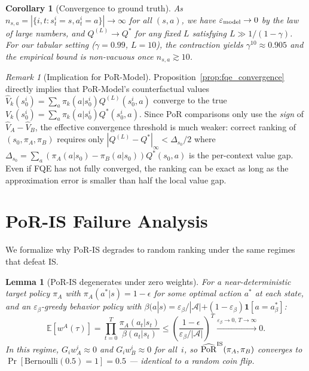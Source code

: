 \documentclass[10pt]{article}
\theoremstyle{plain}
\newtheorem{lemma}[theorem]{Lemma}
\newtheorem{corollary}[theorem]{Corollary}
\theoremstyle{definition}
\theoremstyle{remark}
\newtheorem{remark}{Remark}
\newcommand{\E}{\mathbb{E}}
\newcommand{\PoR}{\mathrm{PoR}}
\newcommand{\calA}{\mathcal{A}}
\begin{document}
\begin{corollary}[Convergence to ground truth]
  \label{cor:fqe_gt}
  As $n_{s,a}=|\{i,t: s_t^i=s, a_t^i=a\}|\to\infty$ for all $(s,a)$,
  we have $\varepsilon_{\rm model}\to 0$ by the law of large numbers,
  and $Q^{(L)}\to Q^*$ for any fixed $L$ satisfying $L\gg 1/(1-\gamma)$.
  For our tabular setting ($\gamma=0.99$, $L=10$), the contraction yields
  $\gamma^{10}\approx 0.905$ and the empirical bound is non-vacuous once
  $n_{s,a}\gtrsim 10$.
\end{corollary}

\begin{remark}[Implication for PoR-Model]
  Proposition~\ref{prop:fqe_convergence} directly implies that
  PoR-Model's counterfactual values $\hat{V}_k(s_0^i)=\sum_a\pi_k(a|s_0^i)Q^{(L)}(s_0^i,a)$
  converge to the true $V_k(s_0^i)=\sum_a\pi_k(a|s_0^i)Q^*(s_0^i,a)$.
  Since PoR comparisons only use the \emph{sign} of $\hat{V}_A-\hat{V}_B$,
  the effective convergence threshold is much weaker: correct ranking of
  $(s_0,\pi_A,\pi_B)$ requires only $|Q^{(L)}-Q^*|_\infty < \Delta_{s_0}/2$
  where $\Delta_{s_0}=\sum_a(\pi_A(a|s_0)-\pi_B(a|s_0))Q^*(s_0,a)$ is the
  per-context value gap.  Even if FQE has not fully converged, the ranking
  can be exact as long as the approximation error is smaller than half the
  local value gap.
\end{remark}

\section{PoR-IS Failure Analysis}
\label{app:poris_failure}

We formalize why PoR-IS degrades to random ranking under the same regimes
that defeat IS.

\begin{lemma}[PoR-IS degenerates under zero weights]
  \label{lem:poris_failure}
  For a near-deterministic target policy $\pi_A$ with
  $\pi_A(a^*|s)=1-\epsilon$ for some optimal action $a^*$ at each state,
  and an $\varepsilon_\beta$-greedy behavior policy with
  $\beta(a|s)=\varepsilon_\beta/|\calA|+(1-\varepsilon_\beta)\mathbf{1}[a=a_\beta^*]$:
  \begin{equation}
    \E[w^A(\tau)] = \prod_{t=0}^T \frac{\pi_A(a_t|s_t)}{\beta(a_t|s_t)}
    \leq \left(\frac{1-\epsilon}{\varepsilon_\beta/|\calA|}\right)^T
    \xrightarrow{\varepsilon_\beta\to 0,\, T\to\infty} 0.
    \label{eq:wA_zero}
  \end{equation}
  In this regime, $G_i w_A^i\approx 0$ and $G_i w_B^i\approx 0$ for
  all~$i$, so $\widehat{\PoR}^{\rm IS}(\pi_A,\pi_B)$ converges to
  $\Pr[\text{Bernoulli}(0.5)=1]=0.5$ --- identical to a random coin flip.
\end{lemma}
\end{document}
